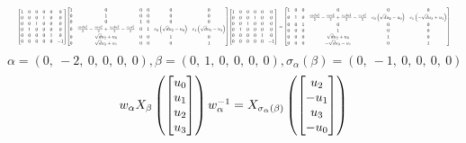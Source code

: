 \documentclass[11pt]{article}
\theoremstyle{definition}
\begin{document}
\[
\scaletoalign{\textwidth}{{\left[\begin{matrix}1 & 0 & 0 & 0 & 0 & 0\\0 & 0 & 0 & 1 & 0 & 0\\0 & 0 & 1 & 0 & 0 & 0\\0 & 1 & 0 & 0 & 0 & 0\\0 & 0 & 0 & 0 & 1 & 0\\0 & 0 & 0 & 0 & 0 & -1\end{matrix}\right]} {\left[\begin{matrix}1 & 0 & 0 & 0 & 0 & 0\\0 & 1 & 0 & 0 & 0 & 0\\0 & 0 & 1 & 0 & 0 & 0\\0 & \frac{c_{0} d u_{2}^{2}}{2} - \frac{c_{0} u_{0}^{2}}{2} + \frac{c_{1} d u_{3}^{2}}{2} - \frac{c_{1} u_{1}^{2}}{2} & 0 & 1 & c_{0} \left(\sqrt{d} u_{2} - u_{0}\right) & c_{1} \left(\sqrt{d} u_{3} - u_{1}\right)\\0 & \sqrt{d} u_{2} + u_{0} & 0 & 0 & 1 & 0\\0 & \sqrt{d} u_{3} + u_{1} & 0 & 0 & 0 & 1\end{matrix}\right]} {\left[\begin{matrix}1 & 0 & 0 & 0 & 0 & 0\\0 & 0 & 0 & 1 & 0 & 0\\0 & 0 & 1 & 0 & 0 & 0\\0 & 1 & 0 & 0 & 0 & 0\\0 & 0 & 0 & 0 & 1 & 0\\0 & 0 & 0 & 0 & 0 & -1\end{matrix}\right]} = {\left[\begin{matrix}1 & 0 & 0 & 0 & 0 & 0\\0 & 1 & 0 & \frac{c_{0} d u_{2}^{2}}{2} - \frac{c_{0} u_{0}^{2}}{2} + \frac{c_{1} d u_{3}^{2}}{2} - \frac{c_{1} u_{1}^{2}}{2} & c_{0} \left(\sqrt{d} u_{2} - u_{0}\right) & c_{1} \left(- \sqrt{d} u_{3} + u_{1}\right)\\0 & 0 & 1 & 0 & 0 & 0\\0 & 0 & 0 & 1 & 0 & 0\\0 & 0 & 0 & \sqrt{d} u_{2} + u_{0} & 1 & 0\\0 & 0 & 0 & - \sqrt{d} u_{3} - u_{1} & 0 & 1\end{matrix}\right]}}
\]
\[
\alpha = \left( 0, \  -2, \  0, \  0, \  0, \  0\right), \beta = \left( 0, \  1, \  0, \  0, \  0, \  0\right), \sigma_{\alpha}(\beta) = \left( 0, \  -1, \  0, \  0, \  0, \  0\right)
\]
\[
\scaletoalign{\textwidth}{w_{\alpha} X_{\beta}\left(\left[\begin{matrix}u_{0}\\u_{1}\\u_{2}\\u_{3}\end{matrix}\right]\right) w_{\alpha}^{-1} = X_{\sigma_{\alpha}\left(\beta\right)}\left(\left[\begin{matrix}u_{2}\\- u_{1}\\u_{3}\\- u_{0}\end{matrix}\right]\right)}
\]
\end{document}
